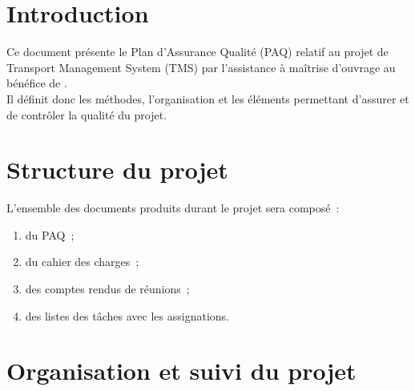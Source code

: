 \documentclass[11pt,fleqn]{report}
\begin{document}
\ZMakeCover


\ZMakeTableOfContents

\chapter{Introduction}
Ce document présente le Plan d'Assurance Qualité (PAQ) relatif au projet de Transport Management System (TMS) par l'assistance à maîtrise d'ouvrage \amo au bénéfice de \mo.
\\
Il définit donc les méthodes, l'organisation et les éléments permettant d'assurer et de contrôler la qualité du projet.

\chapter{Structure du projet}
L'ensemble des documents produits durant le projet sera composé~:
\begin{enumerate}
	\item du PAQ~;
	\item du cahier des charges~;
	\item des comptes rendus de réunions~;
	\item des listes des tâches avec les assignations.
\end{enumerate}

\chapter{Organisation et suivi du projet}
\end{document}

